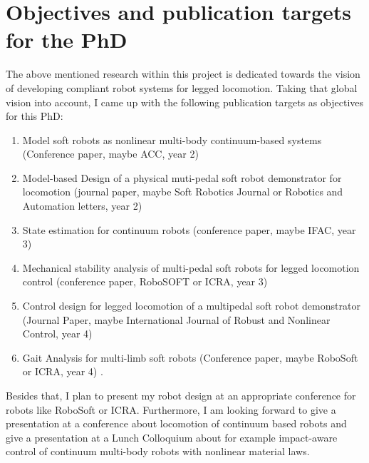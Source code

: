 \section{Objectives and publication targets for the PhD} \label{sec:objectives}
%
The above mentioned research within this project is dedicated towards the vision of developing compliant robot systems for legged locomotion. Taking that global vision into account,
I came up with the following publication targets as objectives for this PhD:

\begin{enumerate}
    \item Model soft robots as nonlinear multi-body continuum-based systems (Conference paper, maybe ACC, year 2) 
    \item Model-based Design of a physical muti-pedal soft robot demonstrator for locomotion  (journal paper, maybe Soft Robotics Journal or Robotics and Automation letters, year 2)
    \item State estimation for continuum robots (conference paper, maybe IFAC, year 3)
    \item Mechanical stability analysis of multi-pedal soft robots for legged locomotion control (conference paper, RoboSOFT or ICRA, year 3)
    \item Control design for legged locomotion of a multipedal soft robot demonstrator (Journal Paper, maybe International Journal of Robust and Nonlinear Control, year 4)
    \item Gait Analysis for multi-limb soft robots (Conference paper, maybe RoboSoft or ICRA, year 4) \; .
\end{enumerate}


Besides that, I plan to present my robot design at an appropriate conference for robots like RoboSoft or ICRA. Furthermore, I am looking forward to give a presentation at a conference
about locomotion of continuum based robots and give a presentation at a Lunch Colloquium about for example impact-aware control of continuum multi-body robots with nonlinear material laws.